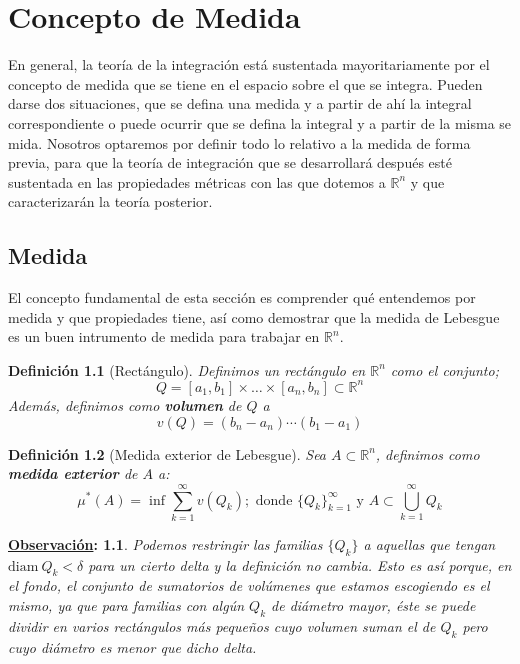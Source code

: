 \documentclass[10pt,a4paper,openright]{book}
\theoremstyle{break}
\newtheorem*{defi}{Definición}
\newtheorem*{obs}{\underline{Observación}:}
\begin{document}
\mainmatter
\hypersetup{linkcolor=black} %
\setcounter{tocdepth}{3}%
\setcounter{secnumdepth}{4}%
\tableofcontents
\hypersetup{linkcolor=blue} %

\chapter{Concepto de Medida}%
En general, la teoría de la integración está sustentada mayoritariamente por el concepto de medida que se tiene en el espacio sobre el que se integra. Pueden darse dos situaciones, que se defina una medida y a partir de ahí la integral correspondiente o puede ocurrir que se defina la integral y a partir de la misma se mida. Nosotros optaremos por definir todo lo relativo a la medida de forma previa, para que la teoría de integración que se desarrollará después esté sustentada en las propiedades métricas con las que dotemos a $\mathbb{R}^n$ y que caracterizarán la teoría posterior.

\section{Medida}
El concepto fundamental de esta sección es comprender qué entendemos por medida y que propiedades tiene, así como demostrar que la medida de Lebesgue es un buen intrumento de medida para trabajar en $\mathbb{R}^n$.

\begin{defi}[Rectángulo]
Definimos un rectángulo en $\mathbb{R}^n$ como el conjunto;
$$Q = \left[ a_1, b_1 \right] \times \ldots \times \left[ a_n, b_n \right] \subset \mathbb{R}^{n}$$
Además, definimos como \textbf{volumen} de $Q$ a 
$$v\left( Q \right) = \left( b_n - a_n \right) \cdots \left( b_1 - a_1 \right)$$
\end{defi}

\begin{defi}[Medida exterior de Lebesgue]
Sea $A \subset \mathbb{R}^{n}$, definimos como \textbf{medida exterior} de $A$ a:
$$
\mu^{*}(A) = \inf \sum_{k=1}^{\infty} v\left( Q_k \right); \text{ donde } \{Q_k\}_{k=1}^{\infty} \text{ y } A \subset \bigcup_{k = 1}^{\infty} Q_k
$$ 
\end{defi}

\begin{obs}
Podemos restringir las familias $\{Q_k\}$ a aquellas que tengan $\mathrm{diam}\ Q_k < \delta$ para un cierto delta y la definición no cambia. Esto es así porque, en el fondo, el conjunto de sumatorios de volúmenes que estamos escogiendo es el mismo, ya que para familias con algún $Q_k$ de diámetro mayor, éste se puede dividir en varios rectángulos más pequeños cuyo volumen suman el de $Q_k$ pero cuyo diámetro es menor que dicho delta.
\end{obs}
\end{document}
